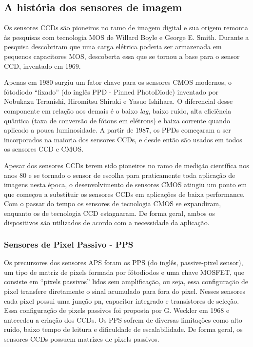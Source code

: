 \documentclass[11pt,a4paper,twocolumn]{article}
\begin{document}
	\subsection*{A história dos sensores de imagem}
		Os sensores CCDs são pioneiros no ramo de imagem digital e sua origem remonta às pesquisas com tecnologia MOS de Willard Boyle e George E. Smith. Durante a pesquisa descobriram que uma carga elétrica poderia ser armazenada em pequenos capacitores MOS, descoberta essa que se tornou a base para o sensor CCD, inventado em 1969.
		
		Apenas em 1980 surgiu um fator chave para os sensores CMOS modernos, o fótodiodo ``fixado'' (do inglês PPD - Pinned PhotoDiode) inventado por Nobukazu Teranishi, Hiromitsu Shiraki e Yasuo Ishihara. O diferencial desse componente em relação aos demais é o baixo \textit{lag}, baixo ruído, alta eficiência quântica (taxa de conversão de fótons em elétrons) e baixa corrente quando aplicado a pouca luminosidade. A partir de 1987, os PPDs começaram a ser incorporados na maioria dos sensores CCDs, e desde então são usados em todos os sensores CCD e CMOS.
	
		Apesar dos sensores CCDs terem sido pioneiros no ramo de medição científica nos anos 80 e se tornado o sensor de escolha para praticamente toda aplicação de imagens nesta época, o desenvolvimento de sensores CMOS atingiu um ponto em que começou a substituir os sensores CCDs em aplicações de baixa performance. Com o passar do tempo os sensores de tecnologia CMOS se expandiram, enquanto os de tecnologia CCD estagnaram. De forma geral, ambos os dispositivos são utilizados de acordo com a necessidade da aplicação.
		
	\subsubsection*{Sensores de Pixel Passivo - PPS} 
		Os precursores dos sensores APS foram os PPS (do inglês, passive-pixel sensor), um tipo de matriz de pixels formada por fótodiodos e uma chave MOSFET, que consiste em ``pixels passivos'' lidos sem amplificação, ou seja, essa configuração de pixel transfere diretamente o sinal acumulado para fora do pixel. Nesses sensores cada pixel possui uma junção pn, capacitor integrado e transistores de seleção. Essa configuração de pixels passivos foi proposta por G. Weckler em 1968 e antecedeu a criação dos CCDs. Os PPS sofrem de diversas limitações como alto ruído, baixo tempo de leitura e dificuldade de escalabilidade. De forma geral, os sensores CCDs possuem matrizes de pixels passivos.
		
\end{document}
